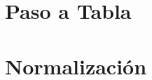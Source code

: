 \documentclass[twoside,openright,titlepage,numbers=noenddot,headinclude,footinclude=true,
cleardoublepage=empty,abstractoff,BCOR=5mm,paper=a4,fontsize=12pt,main=spanish,pdfstartpage=1]{scrreprt}
\theoremstyle{plain}
\begin{document}
\chapter{Paso a Tabla}


\chapter{Normalización}

 




%

\end{document}
